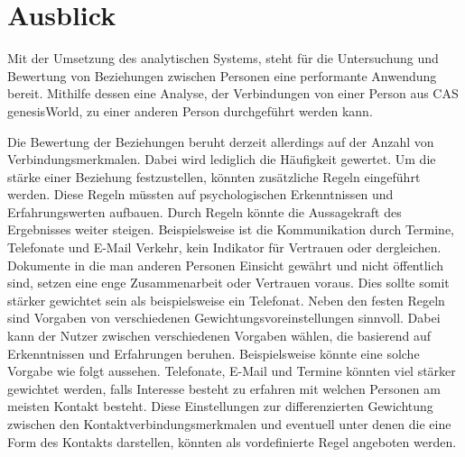 \section{Ausblick}
\label{ch:Ergebnis:sec:Ausblick}

Mit der Umsetzung des analytischen Systems, steht für die Untersuchung und Bewertung von Beziehungen zwischen Personen eine performante Anwendung bereit. Mithilfe dessen eine Analyse, der Verbindungen von einer Person aus CAS genesisWorld, zu einer anderen Person durchgeführt werden kann.  

Die Bewertung der Beziehungen beruht derzeit allerdings auf der Anzahl von Verbindungsmerkmalen. Dabei wird lediglich die Häufigkeit gewertet. Um die stärke einer Beziehung festzustellen, könnten zusätzliche Regeln eingeführt werden. Diese Regeln müssten auf psychologischen Erkenntnissen und Erfahrungswerten aufbauen. Durch Regeln könnte die Aussagekraft des Ergebnisses weiter steigen. Beispielsweise ist die Kommunikation durch Termine, Telefonate und E-Mail Verkehr, kein Indikator für Vertrauen oder dergleichen. Dokumente in die man anderen Personen Einsicht gewährt und nicht öffentlich sind, setzen eine enge Zusammenarbeit oder Vertrauen voraus. Dies sollte somit stärker gewichtet sein als beispielsweise ein Telefonat. Neben den festen Regeln sind Vorgaben von verschiedenen Gewichtungsvoreinstellungen sinnvoll. Dabei kann der Nutzer zwischen verschiedenen Vorgaben wählen, die basierend auf Erkenntnissen und Erfahrungen beruhen. Beispielsweise könnte eine solche Vorgabe wie folgt aussehen. Telefonate, E-Mail und Termine könnten viel stärker gewichtet werden, falls Interesse besteht zu erfahren mit welchen Personen am meisten Kontakt besteht. Diese Einstellungen zur differenzierten Gewichtung zwischen den Kontaktverbindungsmerkmalen und eventuell unter denen die eine Form des Kontakts darstellen, könnten als vordefinierte Regel angeboten werden.

